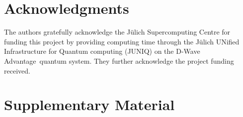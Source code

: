 \documentclass[utf8, nocrop]{FrontiersinHarvardArxiv}
\begin{document}
\section*{Acknowledgments}
The authors gratefully acknowledge the Jülich Supercomputing Centre for funding this project by providing computing time through the Jülich UNified Infrastructure for Quantum computing (JUNIQ) on the D-Wave Advantage\texttrademark\ quantum system. They further acknowledge the project funding received.

 


\clearpage
\iflatexml
\section*{Supplementary Material}
\else\fi

\end{document}
